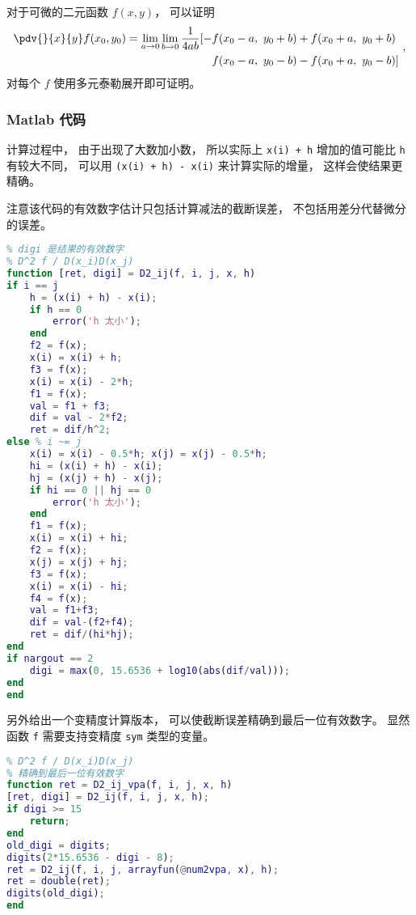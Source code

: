 
\begin{issues}
\issueDraft
\end{issues}


对于可微的二元函数 $f(x,y)$， 可以证明
\begin{equation}
\begin{aligned}
\pdv{}{x}{y} f(x_0,y_0) = \lim_{a\to 0}\lim_{b\to 0}\frac{1}{4ab}[-& f(x_0-a,\ y_0+b) + f(x_0+a,\  y_0+b)\\
& f(x_0-a,\  y_0-b) - f(x_0+a,\  y_0-b)]
\end{aligned}~,
\end{equation}
对每个 $f$ 使用多元泰勒展开即可证明。

\subsubsection{Matlab 代码}

计算过程中， 由于出现了大数加小数， 所以实际上 \verb|x(i) + h| 增加的值可能比 \verb|h| 有较大不同， 可以用 \verb|(x(i) + h) - x(i)| 来计算实际的增量， 这样会使结果更精确。

注意该代码的有效数字估计只包括计算减法的截断误差， 不包括用差分代替微分的误差。
\begin{lstlisting}[language=matlab, caption=D2\_ij.m]
% 数值二阶偏导
% digi 是结果的有效数字
% D^2 f / D(x_i)D(x_j)
function [ret, digi] = D2_ij(f, i, j, x, h)
if i == j
    h = (x(i) + h) - x(i);
    if h == 0
        error('h 太小');
    end
    f2 = f(x);
    x(i) = x(i) + h;
    f3 = f(x);
    x(i) = x(i) - 2*h;
    f1 = f(x);
    val = f1 + f3;
    dif = val - 2*f2;
    ret = dif/h^2;
else % i ~= j
    x(i) = x(i) - 0.5*h; x(j) = x(j) - 0.5*h;
    hi = (x(i) + h) - x(i);
    hj = (x(j) + h) - x(j);
    if hi == 0 || hj == 0
        error('h 太小');
    end
    f1 = f(x);
    x(i) = x(i) + hi;
    f2 = f(x);
    x(j) = x(j) + hj;
    f3 = f(x);
    x(i) = x(i) - hi;
    f4 = f(x);
    val = f1+f3;
    dif = val-(f2+f4);
    ret = dif/(hi*hj);
end
if nargout == 2
    digi = max(0, 15.6536 + log10(abs(dif/val)));
end
end
\end{lstlisting}

另外给出一个变精度计算版本， 可以使截断误差精确到最后一位有效数字。 显然函数 \verb|f| 需要支持变精度 \verb|sym| 类型的变量。
\begin{lstlisting}[language=matlab, caption=D2\_ij\_vpa.m]
% 数值二阶偏导 (变精度)
% D^2 f / D(x_i)D(x_j)
% 精确到最后一位有效数字
function ret = D2_ij_vpa(f, i, j, x, h)
[ret, digi] = D2_ij(f, i, j, x, h);
if digi >= 15
    return;
end
old_digi = digits;
digits(2*15.6536 - digi - 8);
ret = D2_ij(f, i, j, arrayfun(@num2vpa, x), h);
ret = double(ret);
digits(old_digi);
end
\end{lstlisting}
